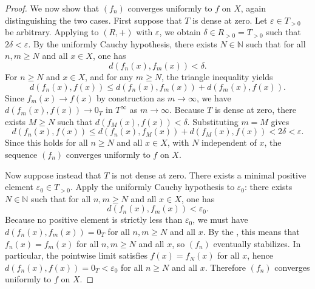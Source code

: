 \begin{proof}
    We now show that $(f_n)$ converges uniformly to $f$ on $X$, again distinguishing the two cases. First suppose that $T$ is dense at zero. Let $\varepsilon \in T_{>0}$ be arbitrary. Applying  to $(R, +)$ with $\varepsilon$, we obtain $\delta \in R_{>0} = T_{>0}$ such that $2\delta < \varepsilon$. By the uniformly Cauchy hypothesis, there exists $N \in \mathbb{N}$ such that for all $n, m \geq N$ and all $x \in X$, one has
    $$d(f_n(x), f_m(x)) < \delta.$$
    For $n \geq N$ and $x \in X$, and for any $m \geq N$, the triangle inequality yields
    $$d(f_n(x), f(x)) \leq d(f_n(x), f_m(x)) + d(f_m(x), f(x)).$$
    Since $f_m(x) \to f(x)$ by construction as $m \to \infty$, we have $d(f_m(x), f(x)) \to 0_T$ in $T^\infty$ as $m \to \infty$. Because $T$ is dense at zero, there exists $M \geq N$ such that $d(f_M(x), f(x)) < \delta$. Substituting $m = M$ gives
    $$d(f_n(x), f(x)) \leq d(f_n(x), f_M(x)) + d(f_M(x), f(x)) < 2\delta < \varepsilon.$$
    Since this holds for all $n \geq N$ and all $x \in X$, with $N$ independent of $x$, the sequence $(f_n)$ converges uniformly to $f$ on $X$.

    Now suppose instead that $T$ is not dense at zero. There exists a minimal positive element $\varepsilon_0 \in T_{>0}$. Apply the uniformly Cauchy hypothesis to $\varepsilon_0$: there exists $N \in \mathbb{N}$ such that for all $n, m \geq N$ and all $x \in X$, one has
    $$d(f_n(x), f_m(x)) < \varepsilon_0.$$
    Because no positive element is strictly less than $\varepsilon_0$, we must have $d(f_n(x), f_m(x)) = 0_T$ for all $n, m \geq N$ and all $x$. By the , this means that $f_n(x) = f_m(x)$ for all $n, m \geq N$ and all $x$, so $(f_n)$ eventually stabilizes. In particular, the pointwise limit satisfies $f(x) = f_N(x)$ for all $x$, hence $d(f_n(x), f(x)) = 0_T < \varepsilon_0$ for all $n \geq N$ and all $x$. Therefore $(f_n)$ converges uniformly to $f$ on $X$.
\end{proof}

